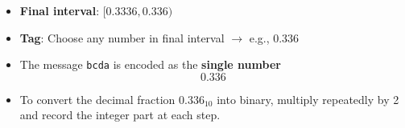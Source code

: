 \documentclass[11pt,a4paper]{book}
\newcounter{qna}[chapter]
\renewcommand{\theqna}{\thechapter.\arabic{qna}}
\newenvironment{questionanswerbox}{
    \refstepcounter{qna}%
    \begin{tcolorbox}[
        enhanced,
        breakable,
        colback=softlavender!10,
        colframe=softlavender!200,
        title={Example~\theqna}, %
        fonttitle=\bfseries,
        coltitle=white,
        colbacktitle=softlavender!200,
        sharp corners,
        boxrule=1pt,
        left=8pt,
        right=8pt,
        top=6pt,
        bottom=6pt
    ]
}{
    \end{tcolorbox}
}
\begin{document}
\begin{questionanswerbox}
\begin{itemize}
\begin{enumerate}
                  \item \textbf{Symbol d} (now: range of interest $[0.330,0.336)$)
                        \begin{itemize}
                            \item Current interval: $L=0.330,\; U=0.336,\; D=U-L=0.006$.
                            \item Subintervals inside $[0.330,0.336)$ (widths scaled by $D=0.006$):
                                  \[
                                      \begin{aligned}
                                          \text{d} & : {[0.330,\;0.330 + 0.006\times0.1)} = {[0.330,\;0.3306)}    \\
                                          \text{c} & : {[0.3306,\;0.3306 + 0.006\times0.2)} = {[0.3306,\;0.3318)} \\
                                          \text{b} & : {[0.3318,\;0.3318 + 0.006\times0.3)} = {[0.3318,\;0.3336)} \\
                                          \text{a} & : {[0.3336,\;0.3336 + 0.006\times0.4)} = {[0.3336,\;0.3360)}
                                      \end{aligned}
                                  \]
                        \end{itemize}

                  \item \textbf{Symbol a} (now: range of interest $[0.3336,0.3360)$)
                        \begin{itemize}
                            \item The true encoded value can be any number inside this interval
                            \item Every number inside this interval will correctly decode to the same original message
                            \item So both 0.334, 0.335, or 0.3359 would decode back to bcda
                        \end{itemize}
              \end{enumerate}
        \item \textbf{Final interval}: \([0.3336, 0.336)\)
        \item  \textbf{Tag}: Choose any number in final interval $\rightarrow$ e.g., $\mathbf{0.336}$
        \item The message \texttt{bcda} is encoded as the \textbf{single number}
              \[
                  \boxed{0.336}
              \]
        \item To convert the decimal fraction \(0.336_{10}\) into binary, multiply repeatedly by 2
              and record the integer part at each step.


\end{itemize}
\end{questionanswerbox}
\end{document}
